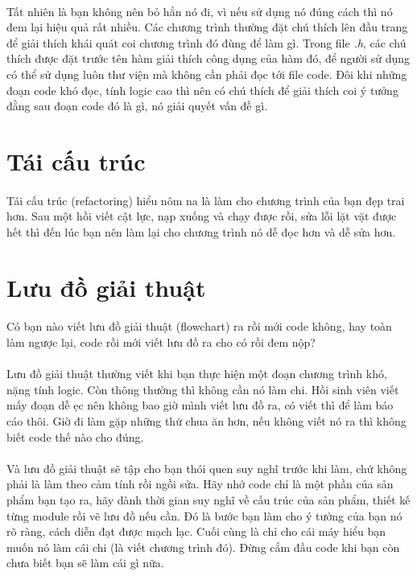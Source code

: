 \documentclass[12pt,a5paper]{book}
\begin{document}
\paragraph{}
Tất nhiên là bạn không nên bỏ hẳn nó đi, vì nếu sử dụng nó đúng cách thì nó đem lại hiệu quả rất nhiều. Các chương trình thường đặt chú thích lên đầu trang để giải thích khái quát coi chương trình đó đùng để làm gì. Trong file \textit{.h}, các chú thích được đặt trước tên hàm giải thích công dụng của hàm đó, để người sử dụng có thể sử dụng luôn thư viện mà không cần phải đọc tới file code. Đôi khi những đoạn code khó đọc, tính logic cao thì nên có chú thích để giải thích coi ý tưởng đằng sau đoạn code đó là gì, nó giải quyết vấn đề gì.
\section{Tái cấu trúc}
\paragraph{}
Tái cấu trúc (refactoring) hiểu nôm na là làm cho chương trình của bạn đẹp trai hơn. Sau một hồi viết cật lực, nạp xuống và chạy được rồi, sửa lỗi lặt vặt được hết thì đến lúc bạn nên làm lại cho chương trình nó dễ đọc hơn và dễ sửa hơn.
\section{Lưu đồ giải thuật}
\paragraph{}
Có bạn nào viết lưu đồ giải thuật (flowchart) ra rồi mới code không, hay toàn làm ngược lại, code rồi mới viết lưu đồ ra cho có rồi đem nộp?
\paragraph{}
Lưu đồ giải thuật thường viết khi bạn thực hiện một đoạn chương trình khó, nặng tính logic. Còn thông thường thì không cần nó làm chi. Hồi sinh viên viết mấy đoạn dễ ẹc nên không bao giờ mình viết lưu đồ ra, có viết thì để làm báo cáo thôi. Giờ đi làm gặp những thứ chua ăn hơn, nếu không viết nó ra thì không biết code thế nào cho đúng. 
\paragraph{}
Và lưu đồ giải thuật sẽ tập cho bạn thói quen suy nghĩ trước khi làm, chứ không phải là làm theo cảm tính rồi ngồi sửa. Hãy nhớ code chỉ là một phần của sản phẩm bạn tạo ra, hãy dành thời gian suy nghĩ về cấu trúc của sản phẩm, thiết kế từng module rồi vẽ lưu đồ nếu cần. Đó là bước bạn làm cho ý tưởng của bạn nó rõ ràng, cách diễn đạt được mạch lạc. Cuối cùng là chỉ cho cái máy hiểu bạn muốn nó làm cái chi (là viết chương trình đó). Đừng cắm đầu code khi bạn còn chưa biết bạn sẽ làm cái gì nữa.
\end{document}
